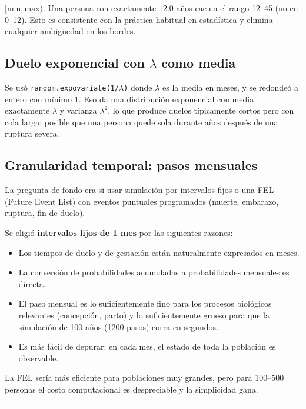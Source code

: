 \documentclass[12pt,a4paper]{article}
\begin{document}
$[\mathrm{min}, \mathrm{max})$. Una persona con exactamente $12.0$ años cae en el rango 12--45 (no en 0--12). Esto es consistente con la práctica habitual en estadística y elimina cualquier ambigüedad en los bordes.

\subsection{Duelo exponencial con $\lambda$ como media}

Se usó \texttt{random.expovariate(1/$\lambda$)} donde $\lambda$ es la media en meses, y se redondeó a entero con mínimo 1. Eso da una distribución exponencial con media exactamente $\lambda$ y varianza $\lambda^2$, lo que produce duelos típicamente cortos pero con cola larga: posible que una persona quede sola durante años después de una ruptura severa.

\subsection{Granularidad temporal: pasos mensuales}

La pregunta de fondo era si usar simulación por intervalos fijos o una FEL (Future Event List) con eventos puntuales programados (muerte, embarazo, ruptura, fin de duelo).

Se eligió \textbf{intervalos fijos de 1 mes} por las siguientes razones:

\begin{itemize}
    \item Los tiempos de duelo y de gestación están naturalmente expresados en meses.
    \item La conversión de probabilidades acumuladas a probabilidades mensuales es directa.
    \item El paso mensual es lo suficientemente fino para los procesos biológicos relevantes (concepción, parto) y lo suficientemente grueso para que la simulación de 100 años (1200 pasos) corra en segundos.
    \item Es más fácil de depurar: en cada mes, el estado de toda la población es observable.
\end{itemize}

La FEL sería más eficiente para poblaciones muy grandes, pero para 100--500 personas el costo computacional es despreciable y la simplicidad gana.

\begin{center}\rule{0.7\linewidth}{0.4pt}\end{center}
\end{document}
